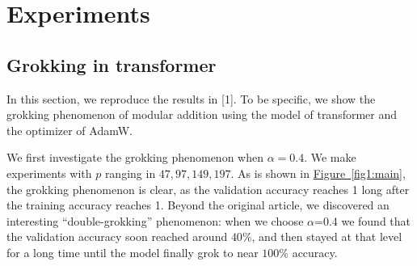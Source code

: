 \documentclass{article}
\begin{document}



\vspace{-1em}
\section{Experiments}
\vspace{-1em}
\label{gen_inst}

\subsection{Grokking in transformer}
\vspace{-0.5em}
In this section, we reproduce the results in [1]. To be specific, we show the grokking phenomenon of modular addition using the model of transformer and the optimizer of AdamW.

We first investigate the grokking phenomenon when $\alpha = 0.4$. We make experiments with $p$ ranging in $47, 97, 149, 197$. As is shown in \hyperref[fig1:main]{Figure~\ref{fig1:main}}, the grokking phenomenon is clear, as the validation accuracy reaches 1 long after the training accuracy reaches 1. Beyond the original article, we discovered an interesting “double-grokking” phenomenon: when we choose $\alpha$=0.4 we found that the validation accuracy soon reached around $40\%$, and then stayed at that level for a long time until the model finally grok to near $100\%$ accuracy.
\end{document}
